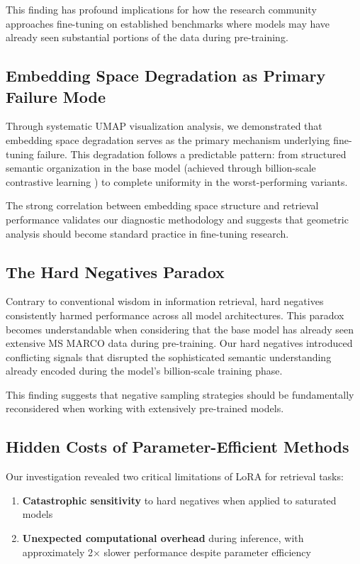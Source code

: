 This finding has profound implications for how the research community approaches fine-tuning on established benchmarks where models may have already seen substantial portions of the data during pre-training.

\subsection{Embedding Space Degradation as Primary Failure Mode}

Through systematic UMAP visualization analysis, we demonstrated that embedding space degradation serves as the primary mechanism underlying fine-tuning failure. This degradation follows a predictable pattern: from structured semantic organization in the base model (achieved through billion-scale contrastive learning \cite{gao2021simcse}) to complete uniformity in the worst-performing variants.

The strong correlation between embedding space structure and retrieval performance validates our diagnostic methodology and suggests that geometric analysis should become standard practice in fine-tuning research.

\subsection{The Hard Negatives Paradox}

Contrary to conventional wisdom in information retrieval, hard negatives consistently harmed performance across all model architectures. This paradox becomes understandable when considering that the base model has already seen extensive MS MARCO data during pre-training. Our hard negatives introduced conflicting signals that disrupted the sophisticated semantic understanding already encoded during the model's billion-scale training phase.

This finding suggests that negative sampling strategies should be fundamentally reconsidered when working with extensively pre-trained models.

\subsection{Hidden Costs of Parameter-Efficient Methods}

Our investigation revealed two critical limitations of LoRA for retrieval tasks:
\begin{enumerate}
\item \textbf{Catastrophic sensitivity} to hard negatives when applied to saturated models
\item \textbf{Unexpected computational overhead} during inference, with approximately 2× slower performance despite parameter efficiency
\end{enumerate}


